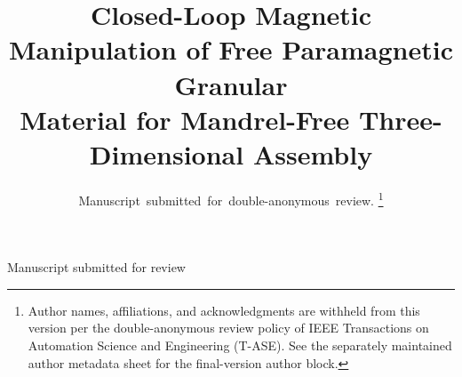 \documentclass[journal]{IEEEtran}
\begin{document}
\title{Closed-Loop Magnetic Manipulation of Free Paramagnetic Granular\\
Material for Mandrel-Free Three-Dimensional Assembly}

\author{Manuscript~submitted~for~double-anonymous~review.
\thanks{Author names, affiliations, and acknowledgments are withheld from
this version per the double-anonymous review policy of IEEE Transactions on
Automation Science and Engineering (T-ASE). See the separately maintained
author metadata sheet for the final-version author block.}}

%
{Manuscript submitted for review}

\maketitle
\end{document}
